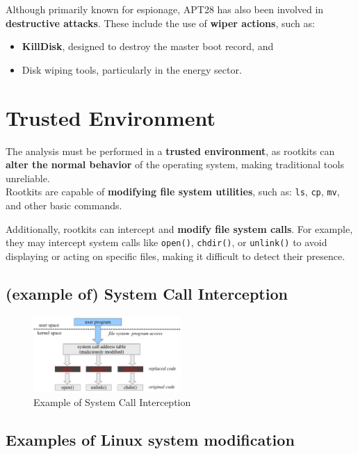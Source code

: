 Although primarily known for espionage, APT28 has also been involved in \textbf{destructive attacks}. These include the use of \textbf{wiper actions}, such as:
\begin{itemize}[itemsep=0pt]
    \item \textbf{KillDisk}, designed to destroy the master boot record, and
    \item Disk wiping tools, particularly in the energy sector.
\end{itemize}


\section{Trusted Environment}

The analysis must be performed in a \textbf{trusted environment}, as rootkits can \textbf{alter the normal behavior} of the operating system, making traditional tools unreliable.\\  
Rootkits are capable of \textbf{modifying file system utilities}, such as: \texttt{ls}, \texttt{cp}, \texttt{mv}, and other basic commands. \bigskip

Additionally, rootkits can intercept and \textbf{modify file system calls}. For example, they may intercept system calls like \texttt{open()}, \texttt{chdir()}, or \texttt{unlink()} to avoid displaying or acting on specific files, making it difficult to detect their presence.

\subsection{(example of) System Call Interception}
\begin{figure}[!ht]
    \centering
    \includegraphics[width=0.5\textwidth]{img/sys_call_intercept.png}
    \caption{Example of System Call Interception}
    \label{fig:syscall_interception}
\end{figure}


\subsection{Examples of Linux system modification}

